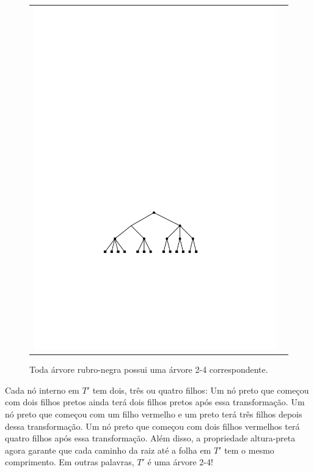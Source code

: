 \begin{figure}
\begin{center}
\begin{tabular}{cc}
			\includegraphics[scale=0.90909]{figs/24rb-2}
		\end{tabular}
	\end{center}
	\caption{Toda árvore rubro-negra possui uma árvore 2-4 correspondente.}
\end{figure}

Cada nó interno em $T'$ tem dois, três ou quatro filhos: Um nó preto
que começou com dois filhos pretos ainda terá dois
filhos pretos após essa transformação. Um nó preto que começou
com um filho vermelho e um preto terá três filhos depois dessa
transformação. Um nó preto que começou com dois filhos vermelhos
terá quatro filhos após essa transformação. Além disso, a
propriedade altura-preta agora garante que cada caminho da raiz até a folha em $T'$ tem o
mesmo comprimento. Em outras palavras, $T'$ é uma árvore 2-4!


